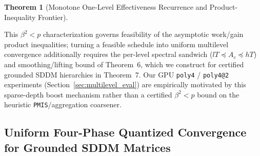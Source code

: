 \documentclass[10pt]{article}
\newtheorem{theorem}{Theorem}
\begin{document}
\begin{theorem}[Monotone One-Level Effectiveness Recurrence and Product-Inequality Frontier]
\end{theorem}

This $\beta^2 < p$ characterization governs feasibility of the asymptotic work/gain product inequalities; turning a feasible schedule into uniform multilevel convergence additionally requires the per-level spectral sandwich ($l T \preceq A_c \preceq h T$) and smoothing/lifting bound of Theorem~6, which we construct for certified grounded SDDM hierarchies in Theorem~7. Our GPU \texttt{poly4} / \texttt{poly4@2} experiments (Section~\ref{sec:multilevel_eval}) are empirically motivated by this sparse-depth boost mechanism rather than a certified $\beta^2 < p$ bound on the heuristic \texttt{PMIS}/aggregation coarsener.

\subsection{Uniform Four-Phase Quantized Convergence for Grounded SDDM Matrices}
\end{document}
